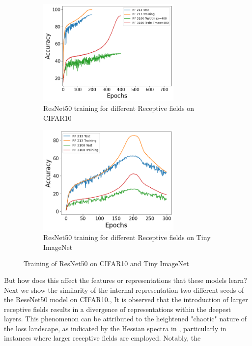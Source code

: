 \begin{figure}[!htp]
  \begin{subfigure}[b]{0.45\textwidth}
      \centering
      \includegraphics[width=7cm]{images/resnet50_CIFAR10_training.png}
      \caption{ResNet50 training for different Receptive fields on CIFAR10}
      \label{fig:images-resnet50_CIFAR10_training-png}
    \end{subfigure}
    \hfill
    \begin{subfigure}[b]{0.45\textwidth}
      \centering
      \includegraphics[width=7cm]{images/resnet50_Tiny_imagenet_training.png}
      \caption{ResNet50 training for different Receptive fields on Tiny ImageNet}
      \label{fig:images-resnet50_Tiny_imagenet_training-png}
    \end{subfigure}
     \caption{Training of ResNet50 on CIFAR10 and Tiny ImageNet}
     \label{fig:training_trajectories}
\end{figure}
But how does this affect the features or representations that these models learn? Next we show the similarity of the
internal representation two different seeds of the ReseNet50 model on CIFAR10., It is observed that the introduction of
larger receptive fields results in a divergence of representations within the deepest layers. This phenomenon can be
attributed to the heightened "chaotic" nature of the loss landscape, as indicated by the Hessian spectra in , particularly in instances where larger receptive fields are employed. Notably, the
